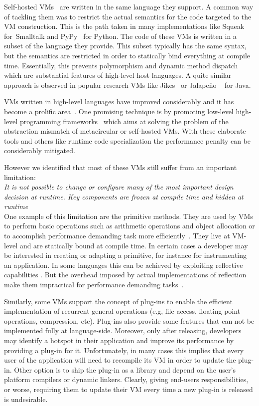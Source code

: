 \documentclass[10pt,preprint,letter]{sigplanconf}
\newcommand{\ST}  {Small\-talk\xspace}
\begin{document}
Self-hosted VMs~\cite{Chev11a} are written in the same language they support.
A common way of tackling them was to restrict the actual semantics for the code targeted to the VM construction. 
This is the path taken in many implementations like Squeak~\cite{Inga97a} for~\ST and PyPy~\cite{Rigo06a} for Python.
The code of these VMs is written in a subset of the language they provide.
This subset typically has the same syntax, but the semantics are restricted in order to statically bind everything at  compile time. 
Essentially, this prevents polymorphism and dynamic method dispatch which are substantial features of high-level host languages.
A quite similar approach is observed in popular research VMs like Jikes~\cite{Alpe05a} or Jalapeño ~\cite{Alpe99a} for Java. 


VMs written in high-level languages have improved considerably and it has become a prolific area~\cite{Wimm13a,Chev11a}.
One promising technique is by promoting low-level high-level programming frameworks~\cite{Fram09a} which aims at solving the problem of the abstraction mismatch of metacircular or self-hosted VMs. 
With these elaborate tools and others like runtime code specialization the performance penalty can be considerably mitigated.



However we identified that most of these VMs still suffer from an important limitation:
\\

\emph{It is not possible to change or configure many of the most important design decision at runtime. Key components are frozen at compile time and hidden at runtime}\\

One example of this limitation are the primitive methods. They are used by VMs to perform basic operations such as arithmetic operations and object allocation or to accomplish performance demanding task more efficiently~\cite{Gold83a}. 
They live at VM-level and are statically bound at compile time. 
In certain cases a developer may be interested in creating or adapting a primitive, for instance for instrumenting an application. 
In some languages this can be achieved by exploiting reflective capabilities \cite{Roet07b}.
But the overhead imposed by actual implementations of reflection make them impractical for performance demanding tasks~\cite{Male96a}.

Similarly, some VMs support the concept of plug-ins to enable the efficient implementation of recurrent general operations (e.g, file access, floating point operations, compression, etc).
Plug-ins also provide some features that can not be implemented fully at language-side.
Moreover, only after releasing, developers may identify a hotspot in their application and improve its performance by providing a plug-in for it.
Unfortunately, in many cases this implies that every user of the application will need to recompile its VM in order to update the plug-in.
Other option is to ship the plug-in as a library and depend on the user's platform compilers or dynamic linkers.
Clearly, giving end-users responsibilities, or worse, requiring them to update their VM every time a new plug-in is released is undesirable. 
\end{document}

